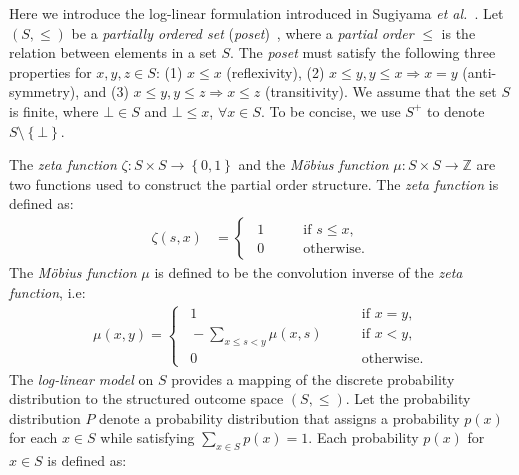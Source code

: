 \documentclass[letterpaper]{article} %
\begin{document}
		Here we introduce the log-linear formulation introduced in Sugiyama \textit{et al.}~\cite{sugiyama2016information}. Let $\left( S, \le \right)$ be a \textit{partially ordered set} (\textit{poset})~\cite{gierz2003continuous}, where a \textit{partial order} $\le$ is the relation between elements in a set $S$. The \textit{poset} must satisfy the following three properties for $x, y, z \in S$: (1) $x \le x$ (reflexivity), (2) $x \le y, y \le x \Rightarrow x = y$ (anti-symmetry), and (3) $x \le y, y \le z \Rightarrow x \le z$ (transitivity). We assume that the set $S$ is finite, where $\bot \in S$ and $\bot \le x$, $\forall x \in S$. To be concise, we use $S^{+}$ to denote $S\setminus \left\{ \bot \right\}$.

		The \textit{zeta function} $\zeta : S \times S \rightarrow \left\{ 0, 1 \right\}$ and the \textit{M\"{o}bius function} $\mu : S \times S \rightarrow \mathbb{Z}$ are two functions used to construct the partial order structure. The \textit{zeta function} is defined as:
		\begin{align*}
			\zeta \left( s, x \right) &=
			\begin{cases}
				\ \ 1 \qquad &\text{if } s \le x, \\
				\ \ 0 \qquad &\text{otherwise}.
			\end{cases}
		\end{align*}
		The \textit{M\"{o}bius function} $\mu$ is defined to be the convolution inverse of the \textit{zeta function}, i.e:
		\begin{align*}
			\mu \left( x, y \right) =
			\begin{cases}
				\ \ 1 \qquad &\text{if } x = y, \\
				\ \ -\sum_{x \le s < y} \mu \left( x, s \right) \qquad &\text{if } x < y, \\
				\ \ 0 \qquad &\text{otherwise}.
			\end{cases}
		\end{align*}
		The \textit{log-linear model} on $S$ provides a mapping of the discrete probability distribution to the structured outcome space $\left( S, \le \right)$. Let the probability distribution $P$ denote a probability distribution that assigns a probability $p \left( x \right)$ for each $x \in S$ while satisfying $\sum_{x \in S} p \left( x \right) = 1$. Each probability $p \left( x \right)$ for $x \in S$ is defined as:
\end{document}

